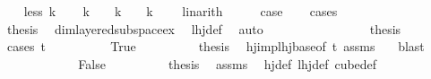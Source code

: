 \begin{isabellebody}
\ \ \isamarkupfalse%
\ {\isacharparenleft}{\kern0pt}less\ k{\isacharparenright}{\kern0pt}\isanewline
\ \ \isamarkupfalse%
\ {\isachardoublequoteopen}k\ {\isacharequal}{\kern0pt}\ {}{\isachardoublequoteclose}\ {\isacharbar}{\kern0pt}\ {\isachardoublequoteopen}k\ {\isacharequal}{\kern0pt}\ {}{\isachardoublequoteclose}\ {\isacharbar}{\kern0pt}\ {\isachardoublequoteopen}k\ {\isasymge}\ {}{\isachardoublequoteclose}\ \isamarkupfalse%
\ linarith\isanewline
\ \ \isamarkupfalse%
\ \isamarkupfalse%
\ {\isacharquery}{\kern0pt}case\isanewline
\ \ \isamarkupfalse%
\ {\isacharparenleft}{\kern0pt}cases{\isacharparenright}{\kern0pt}\isanewline
\ \ \ \ \isamarkupfalse%
\ {}\isanewline
\ \ \ \ \isamarkupfalse%
\ \isamarkupfalse%
\ {\isacharquery}{\kern0pt}thesis\ \isamarkupfalse%
\ dim{}{\isacharunderscore}{\kern0pt}layered{\isacharunderscore}{\kern0pt}subspace{\isacharunderscore}{\kern0pt}ex\ \isamarkupfalse%
\ lhj{\isacharunderscore}{\kern0pt}def\ \isamarkupfalse%
\ auto\isanewline
\ \ \isamarkupfalse%
\isanewline
\ \ \ \ \isamarkupfalse%
\ {}\isanewline
\ \ \ \ \isamarkupfalse%
\ \isamarkupfalse%
\ {\isacharquery}{\kern0pt}thesis\isanewline
\ \ \ \ \isamarkupfalse%
\ {\isacharparenleft}{\kern0pt}cases\ {\isachardoublequoteopen}t\ {\isachargreater}{\kern0pt}\ {}{\isachardoublequoteclose}{\isacharparenright}{\kern0pt}\isanewline
\ \ \ \ \ \ \isamarkupfalse%
\ True\isanewline
\ \ \ \ \ \ \isamarkupfalse%
\ \isamarkupfalse%
\ {\isacharquery}{\kern0pt}thesis\ \isamarkupfalse%
\ hj{\isacharunderscore}{\kern0pt}imp{\isacharunderscore}{\kern0pt}lhj{\isacharunderscore}{\kern0pt}base{\isacharbrackleft}{\kern0pt}of\ {\isachardoublequoteopen}t{\isachardoublequoteclose}{\isacharbrackright}{\kern0pt}\ assms\ {}\ \isamarkupfalse%
\ blast\isanewline
\ \ \ \ \isamarkupfalse%
\isanewline
\ \ \ \ \ \ \isamarkupfalse%
\ False\isanewline
\ \ \ \ \ \ \isamarkupfalse%
\ \isamarkupfalse%
\ {\isacharquery}{\kern0pt}thesis\ \isamarkupfalse%
\ assms\ \isamarkupfalse%
\ hj{\isacharunderscore}{\kern0pt}def\ lhj{\isacharunderscore}{\kern0pt}def\ cube{\isacharunderscore}{\kern0pt}def\ \isamarkupfalse%

\end{isabellebody}
